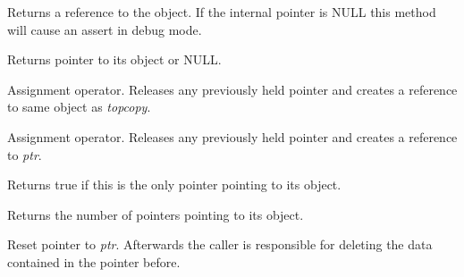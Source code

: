 \label{wxsharedptroperatorreft}


Returns a reference to the object. If the internal pointer is NULL this
method will cause an assert in debug mode.

\label{wxsharedptroperatorderef}


Returns pointer to its object or NULL.

\label{wxsharedptroperatorassign}


Assignment operator. Releases any previously held pointer
and creates a reference to same object as {\it topcopy}.

\label{wxsharedptroperatorassign2}


Assignment operator. Releases any previously held pointer
and creates a reference to {\it ptr}.

\label{wxsharedptrunique}


Returns true if this is the only pointer pointing to its object.

\label{wxsharedptruse\_count}


Returns the number of pointers pointing to its object.

\label{wxsharedptrreset}


Reset pointer to {\it ptr}. Afterwards the caller is responsible
for deleting the data contained in the pointer before.

